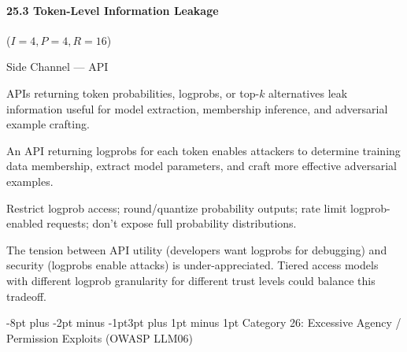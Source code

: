 \documentclass[conference]{IEEEtran}
\makeatletter
\renewcommand{\subsection}{\@startsection{subsection}{2}{\z@}%
  {-8pt plus -2pt minus -1pt}{3pt plus 1pt minus 1pt}%
  {\normalfont\normalsize\bfseries\sffamily\color{accentblue}}}
\newenvironment{attackentry}{\begin{description}[style=unboxed,leftmargin=0cm,itemsep=1pt,parsep=1pt,topsep=2pt,font=\sffamily\small\color{accentdark}]}{\end{description}}
\makeatother
\begin{document}
\paragraph{25.3 Token-Level Information Leakage} ($I{=}4, P{=}4, R{=}16$)
\begin{attackentry}
\item[Category:] Side Channel --- API
\item[How it works:] APIs returning token probabilities, logprobs, or top-$k$ alternatives leak information useful for model extraction, membership inference, and adversarial example crafting.
\item[Example:] An API returning logprobs for each token enables attackers to determine training data membership, extract model parameters, and craft more effective adversarial examples.
\item[Mitigations:] Restrict logprob access; round/quantize probability outputs; rate limit logprob-enabled requests; don't expose full probability distributions.
\item[Novel Inference (Observed):] The tension between API utility (developers want logprobs for debugging) and security (logprobs enable attacks) is under-appreciated. Tiered access models with different logprob granularity for different trust levels could balance this tradeoff.
\end{attackentry}

\subsection{Category 26: Excessive Agency / Permission Exploits (OWASP LLM06)}
\end{document}
